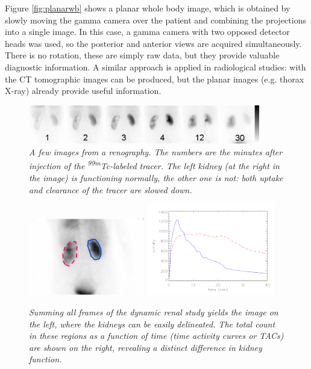 Figure \ref{fig:planarwb} shows a planar whole body image, which is obtained
by slowly moving the gamma camera over the patient and combining the
projections into a single image. In this case, a gamma camera with two opposed
detector heads was used, so the posterior and anterior views are acquired
simultaneously. There is no rotation, these are simply raw data, but they
provide valuable diagnostic information. A similar approach is applied in
radiological studies: with the CT tomographic images can be produced, but the
planar images (e.g. thorax X-ray) already provide useful information. 

\begin{figure}[tb]
\centering
\includegraphics[width=0.9\textwidth]{figs/fig_renaldynimg.pdf}
\caption{\label{fig:renaldyn} \emph{A few images from a
    renography. The numbers are the minutes after injection of the
    \textsuperscript{99m}Tc-labeled tracer. The left kidney (at the right in the
    image) is functioning normally, the other one is not: both uptake
    and clearance of the tracer are slowed down.}}
\end{figure}

\begin{figure}[tb]
\centering
\includegraphics[width=0.45\textwidth]{figs/fig_renalrois.pdf}
  \includegraphics[width=0.5\textwidth]{figs/fig_renalplot.pdf}
\caption{\label{fig:renalroi} \emph{Summing all frames of the dynamic
    renal study yields the image on the left, where the kidneys can be
    easily delineated. The total count in these regions as a function
    of time (time activity curves or TACs) are shown on the right,
    revealing a distinct difference in kidney function.}}
\end{figure}

